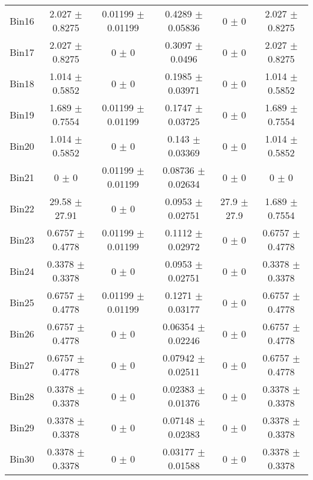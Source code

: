 \begin{tabular}{@{\extracolsep{4pt}}lccccc@{}}
     Bin16 & 2.027 $\pm$ 0.8275 & 0.01199 $\pm$ 0.01199 & 0.4289 $\pm$ 0.05836 & 0 $\pm$ 0 & 2.027 $\pm$ 0.8275 \\ 
     Bin17 & 2.027 $\pm$ 0.8275 & 0 $\pm$ 0 & 0.3097 $\pm$ 0.0496 & 0 $\pm$ 0 & 2.027 $\pm$ 0.8275 \\ 
     Bin18 & 1.014 $\pm$ 0.5852 & 0 $\pm$ 0 & 0.1985 $\pm$ 0.03971 & 0 $\pm$ 0 & 1.014 $\pm$ 0.5852 \\ 
     Bin19 & 1.689 $\pm$ 0.7554 & 0.01199 $\pm$ 0.01199 & 0.1747 $\pm$ 0.03725 & 0 $\pm$ 0 & 1.689 $\pm$ 0.7554 \\ 
     Bin20 & 1.014 $\pm$ 0.5852 & 0 $\pm$ 0 & 0.143 $\pm$ 0.03369 & 0 $\pm$ 0 & 1.014 $\pm$ 0.5852 \\ 
     Bin21 & 0 $\pm$ 0 & 0.01199 $\pm$ 0.01199 & 0.08736 $\pm$ 0.02634 & 0 $\pm$ 0 & 0 $\pm$ 0 \\ 
     Bin22 & 29.58 $\pm$ 27.91 & 0 $\pm$ 0 & 0.0953 $\pm$ 0.02751 & 27.9 $\pm$ 27.9 & 1.689 $\pm$ 0.7554 \\ 
     Bin23 & 0.6757 $\pm$ 0.4778 & 0.01199 $\pm$ 0.01199 & 0.1112 $\pm$ 0.02972 & 0 $\pm$ 0 & 0.6757 $\pm$ 0.4778 \\ 
     Bin24 & 0.3378 $\pm$ 0.3378 & 0 $\pm$ 0 & 0.0953 $\pm$ 0.02751 & 0 $\pm$ 0 & 0.3378 $\pm$ 0.3378 \\ 
     Bin25 & 0.6757 $\pm$ 0.4778 & 0.01199 $\pm$ 0.01199 & 0.1271 $\pm$ 0.03177 & 0 $\pm$ 0 & 0.6757 $\pm$ 0.4778 \\ 
     Bin26 & 0.6757 $\pm$ 0.4778 & 0 $\pm$ 0 & 0.06354 $\pm$ 0.02246 & 0 $\pm$ 0 & 0.6757 $\pm$ 0.4778 \\ 
     Bin27 & 0.6757 $\pm$ 0.4778 & 0 $\pm$ 0 & 0.07942 $\pm$ 0.02511 & 0 $\pm$ 0 & 0.6757 $\pm$ 0.4778 \\ 
     Bin28 & 0.3378 $\pm$ 0.3378 & 0 $\pm$ 0 & 0.02383 $\pm$ 0.01376 & 0 $\pm$ 0 & 0.3378 $\pm$ 0.3378 \\ 
     Bin29 & 0.3378 $\pm$ 0.3378 & 0 $\pm$ 0 & 0.07148 $\pm$ 0.02383 & 0 $\pm$ 0 & 0.3378 $\pm$ 0.3378 \\ 
     Bin30 & 0.3378 $\pm$ 0.3378 & 0 $\pm$ 0 & 0.03177 $\pm$ 0.01588 & 0 $\pm$ 0 & 0.3378 $\pm$ 0.3378 \\ 
\hline\hline
  \end{tabular}
